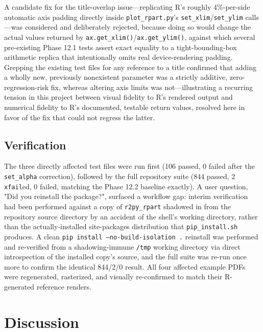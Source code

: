 \documentclass[12pt]{article}
\begin{document}
A candidate fix for the title-overlap issue---replicating R's roughly 4\%-per-side automatic axis padding directly inside \texttt{plot\_rpart.py}'s \texttt{set\_xlim}/\texttt{set\_ylim} calls---was considered and deliberately rejected, because doing so would change the actual values returned by \texttt{ax.get\_xlim()}/\texttt{ax.get\_ylim()}, against which several pre-existing Phase 12.1 tests assert exact equality to a tight-bounding-box arithmetic replica that intentionally omits real device-rendering padding. Grepping the existing test files for any reference to a title confirmed that adding a wholly new, previously nonexistent parameter was a strictly additive, zero-regression-risk fix, whereas altering axis limits was not---illustrating a recurring tension in this project between visual fidelity to R's rendered output and numerical fidelity to R's documented, testable return values, resolved here in favor of the fix that could not regress the latter.

\subsection{Verification}

The three directly affected test files were run first (106 passed, 0 failed after the \texttt{set\_alpha} correction), followed by the full repository suite (844 passed, 2 \texttt{xfail}ed, 0 failed, matching the Phase 12.2 baseline exactly). A user question, "Did you reinstall the package?", surfaced a workflow gap: interim verification had been performed against a copy of \texttt{r2py\_rpart} shadowed in from the repository source directory by an accident of the shell's working directory, rather than the actually-installed site-packages distribution that \texttt{pip\_install.sh} produces. A clean \texttt{pip install --no-build-isolation .} reinstall was performed and re-verified from a shadowing-immune \texttt{/tmp} working directory via direct introspection of the installed copy's source, and the full suite was re-run once more to confirm the identical 844/2/0 result. All four affected example PDFs were regenerated, rasterized, and visually re-confirmed to match their R-generated reference renders.

\section{Discussion}
\label{sec:discussion}
\end{document}
